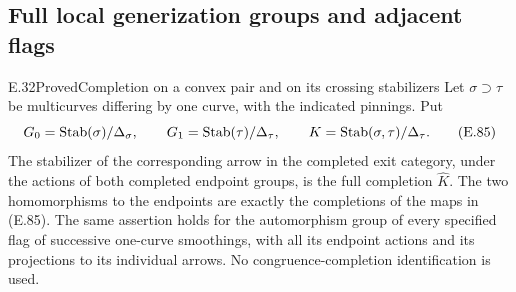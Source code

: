\subsection{Full local generization groups and adjacent flags}

\begin{result}{E.32}{Proved}{Completion on a convex pair and on its crossing stabilizers}
Let $\sigma\supset\tau$ be multicurves differing by one curve,
with the indicated pinnings.  Put
\[
 G_0=\operatorname{Stab}(\sigma)/\Delta_\sigma,\qquad
 G_1=\operatorname{Stab}(\tau)/\Delta_\tau,
 \qquad K=\operatorname{Stab}(\sigma,\tau)/\Delta_\tau.
                                                               \tag{E.85}
\]
The stabilizer of the corresponding arrow in the completed exit
category, under the actions of both completed endpoint groups,
is the full completion $\widehat K$.  The two homomorphisms to
the endpoints are exactly the completions of the maps in (E.85).
The same assertion holds for the automorphism group of every
specified flag of successive one-curve smoothings, with all its
endpoint actions and its projections to its individual arrows.
No congruence-completion identification is used.
\end{result}
